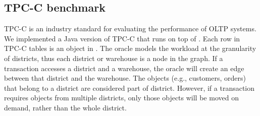 
\subsection{TPC-C benchmark}
\label{sec:imp:tpcc}


TPC-C is an industry standard for evaluating the performance of OLTP systems.
We implemented a Java version of TPC-C that runs on top of \dynastar. 
Each row in TPC-C tables is an object in \dynastar. The oracle models the workload at the granularity of districts,
thus each district or warehouse is a node in the graph. If a transaction accesses a district 
and a warehouse, the oracle will create an edge between that district and the warehouse.
The objects (e.g., customers, orders) that belong to a district 
are considered part of district. However, if a transaction requires
objects from multiple districts, only those objects will be moved on demand, rather than
the whole district.

